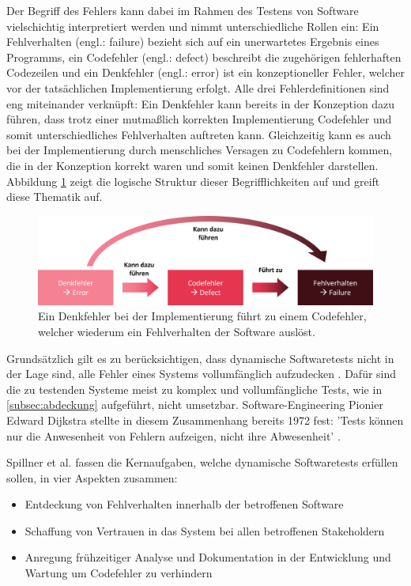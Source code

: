 Der Begriff des Fehlers kann dabei im Rahmen des Testens von Software vielschichtig interpretiert werden und nimmt unterschiedliche Rollen ein: Ein Fehlverhalten (engl.: failure) bezieht sich auf ein unerwartetes Ergebnis eines Programms, ein Codefehler (engl.: defect) beschreibt die zugehörigen fehlerhaften Codezeilen und ein Denkfehler (engl.: error) ist ein konzeptioneller Fehler, welcher vor der tatsächlichen Implementierung erfolgt. Alle drei Fehlerdefinitionen sind eng miteinander verknüpft: Ein Denkfehler kann bereits in der Konzeption dazu führen, dass trotz einer mutmaßlich korrekten Implementierung Codefehler und somit unterschiedliches Fehlverhalten auftreten kann. Gleichzeitig kann es auch bei der Implementierung durch menschliches Versagen zu Codefehlern kommen, die in der Konzeption korrekt waren und somit keinen Denkfehler darstellen. Abbildung \ref{fig:fehler} zeigt die logische Struktur dieser Begrifflichkeiten auf und greift diese Thematik auf.

\begin{figure}[!h]
\centering
\includegraphics[width=0.8\columnwidth]{images/Fehler_Definition.jpg}
\caption{Ein Denkfehler bei der Implementierung führt zu einem Codefehler, welcher wiederum ein Fehlverhalten der Software auslöst.}
\label{fig:fehler}
\end{figure}

Grundsätzlich gilt es zu berücksichtigen, dass dynamische Softwaretests nicht in der Lage sind, alle Fehler eines Systems vollumfänglich aufzudecken \cite[S. 247]{sommerville2012software-engineering}. Dafür sind die zu testenden Systeme meist zu komplex und vollumfängliche Tests, wie in \autoref{subsec:abdeckung} aufgeführt, nicht umsetzbar. Software-Engineering Pionier Edward Dijkstra stellte in diesem Zusammenhang bereits 1972 fest: 'Tests können nur die Anwesenheit von Fehlern aufzeigen, nicht ihre Abwesenheit' \cite{dahl1972structured}.

Spillner et al. \cite[S. 8]{spillner2011software} fassen die Kernaufgaben, welche dynamische Softwaretests erfüllen sollen, in vier Aspekten zusammen:
\begin{itemize}
\item Entdeckung von Fehlverhalten innerhalb der betroffenen Software
\item Schaffung von Vertrauen in das System bei allen betroffenen Stakeholdern
\item Anregung frühzeitiger Analyse und Dokumentation in der Entwicklung und Wartung um Codefehler zu verhindern
\end{itemize}

